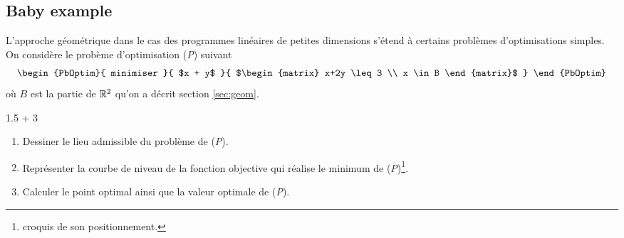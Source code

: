 \documentclass[11pt, a4paper]{article}
\begin{document}
\subsection{Baby example}

L'approche géométrique dans le cas des programmes linéaires de petites
dimensions s'étend à certains problèmes d'optimisations simples. On
considère le probème d'optimisation (\emph{P}) suivant
\[
\begin{PbOptim}{
    minimiser
  }{
    $x + y$
  }{
    $\begin{matrix}
      x+2y \leq 3 \\
      x \in B
    \end{matrix}$
  }
\end{PbOptim}
\]
où $B$ est la partie de $\mathbb{R}^2$ qu'on a décrit section \ref{sec:geom}.

\begin{question}{1.5 + 3}
  \begin{enumerate}
  \item Dessiner le lieu admissible du problème de (\emph{P}).
  \item Représenter la courbe de niveau de la fonction objective qui
    réalise le minimum de (\emph{P})\footnote{croquis de son
      positionnement.}.
  \item Calculer le point optimal ainsi que la valeur optimale de
    (\emph{P}).
  \end{enumerate}
\end{question}
\end{document}
